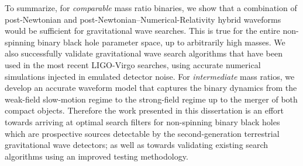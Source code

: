 To summarize, for {\it comparable} mass ratio binaries, we show that a combination
of post-Newtonian and post-Newtonian--Numerical-Relativity hybrid waveforms
would be sufficient for gravitational wave searches. This is true for the 
entire non-spinning binary black hole parameter space, up to arbitrarily high
masses. We also successfully validate gravitational wave search algorithms 
that have been used in the most recent LIGO-Virgo searches, using accurate 
numerical simulations injected in emulated detector noise. 
For {\it intermediate} mass ratios, we develop an accurate waveform 
model that captures the binary dynamics from the weak-field slow-motion
regime to the strong-field regime up to the merger of both compact objects. 
Therefore the work presented in this dissertation is an effort towards
arriving at optimal search filters for non-spinning binary black holes 
which are prospective sources detectable by the second-generation terrestrial
gravitational wave detectors; as well as towards validating existing search 
algorithms using an improved testing methodology.












